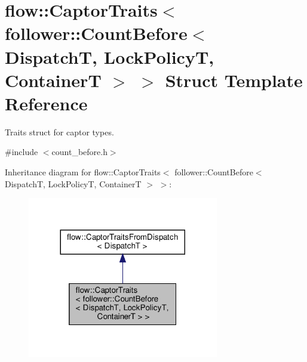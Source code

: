 \hypertarget{structflow_1_1_captor_traits_3_01follower_1_1_count_before_3_01_dispatch_t_00_01_lock_policy_t_00_01_container_t_01_4_01_4}{}\section{flow\+:\+:Captor\+Traits$<$ follower\+:\+:Count\+Before$<$ DispatchT, Lock\+PolicyT, ContainerT $>$ $>$ Struct Template Reference}
\label{structflow_1_1_captor_traits_3_01follower_1_1_count_before_3_01_dispatch_t_00_01_lock_policy_t_00_01_container_t_01_4_01_4}


Traits struct for captor types.  




{\ttfamily \#include $<$count\+\_\+before.\+h$>$}



Inheritance diagram for flow\+:\+:Captor\+Traits$<$ follower\+:\+:Count\+Before$<$ DispatchT, Lock\+PolicyT, ContainerT $>$ $>$\+:
\nopagebreak
\begin{figure}[H]
\begin{center}
\leavevmode
\includegraphics[width=236pt]{structflow_1_1_captor_traits_3_01follower_1_1_count_before_3_01_dispatch_t_00_01_lock_policy_t_0df78b400173407aebeafe326aa328a77}
\end{center}
\end{figure}


